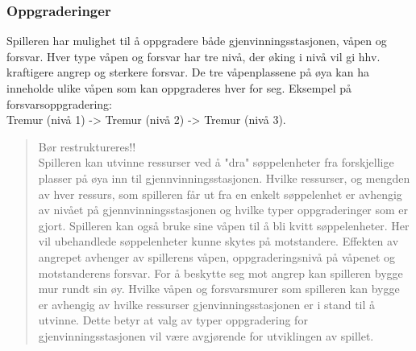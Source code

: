 \subsubsection{Oppgraderinger}
Spilleren har mulighet til å oppgradere både gjenvinningsstasjonen,
våpen og forsvar. Hver type våpen og forsvar har tre nivå, der øking i
nivå vil gi hhv. kraftigere angrep og sterkere forsvar. De tre
våpenplassene på øya kan ha inneholde ulike våpen som kan oppgraderes
hver for seg.
Eksempel på forsvarsoppgradering:\\
Tremur (nivå 1) -> Tremur (nivå 2) -> Tremur (nivå 3).
\begin{quote}
Bør restruktureres!!\\
Spilleren kan utvinne ressurser ved å "dra" søppelenheter fra
forskjellige plasser på øya inn til gjennvinningsstasjonen. Hvilke
ressurser, og mengden av hver ressurs, som spilleren får ut fra en
enkelt søppelenhet er avhengig av nivået på gjennvinningsstasjonen og
hvilke typer oppgraderinger som er gjort. Spilleren kan også bruke sine
våpen til å bli kvitt søppelenheter. Her vil ubehandlede søppelenheter
kunne skytes på motstandere. Effekten av angrepet avhenger av spillerens
våpen, oppgraderingsnivå på våpenet og motstanderens forsvar. For å
beskytte seg mot angrep kan spilleren bygge mur rundt sin øy. Hvilke
våpen og forsvarsmurer som spilleren kan bygge er avhengig av hvilke
ressurser gjenvinningsstasjonen er i stand til å utvinne. Dette betyr at
valg av typer oppgradering for gjenvinningsstasjonen vil være avgjørende
for utviklingen av spillet.\\
\end{quote}
